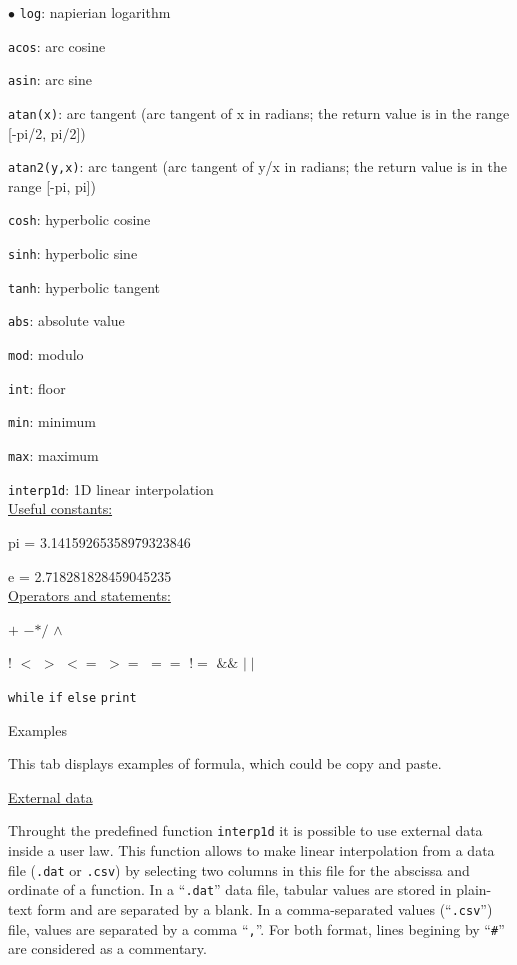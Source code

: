 {{{\begin{list}{$\bullet$}{}
\texttt{log}: napierian logarithm

\texttt{acos}: arc cosine

\texttt{asin}: arc sine           

\texttt{atan(x)}: arc tangent (arc tangent of x in radians; the return value is in the range [-pi/2, pi/2])
 
\texttt{atan2(y,x)}: arc tangent (arc tangent of y/x in radians; the return value is in the range [-pi, pi])

\texttt{cosh}: hyperbolic cosine

\texttt{sinh}: hyperbolic sine

\texttt{tanh}: hyperbolic tangent

\texttt{abs}: absolute value

\texttt{mod}: modulo

\texttt{int}: floor

\texttt{min}: minimum

\texttt{max}: maximum

\texttt{interp1d}: 1D linear interpolation\\


\underline{Useful constants:}

pi = 3.14159265358979323846

e = 2.718281828459045235\\


\underline{Operators and statements:}

$+$ \qquad$-$\qquad $*$\qquad $/$ \qquad$\wedge$ 

! \qquad $<$ \qquad $>$ \qquad $<=$ \qquad $>=$ \qquad $==$ \qquad $!=$ \qquad $\&\&$ \qquad $\mid\mid$ 

\texttt{while} \texttt{if} \texttt{else} \texttt{print}


\item Examples

This tab displays examples of formula, which could be copy and paste.

\end{list}

\underline{External data}

Throught the predefined function \texttt{interp1d} it is possible to use
external data inside a user law. This function allows to make linear interpolation
from a data file (\texttt{.dat} or \texttt{.csv}) by selecting two columns in this file
for the abscissa and ordinate of a function. In a ``\texttt{.dat}'' data file, tabular
values are stored in plain-text form and are separated by a blank. In a comma-separated values
(``\texttt{.csv}'') file, values are separated by a comma ``\texttt{,}''.
For both format, lines begining by ``\texttt{\#}'' are considered as a commentary.

}}}
